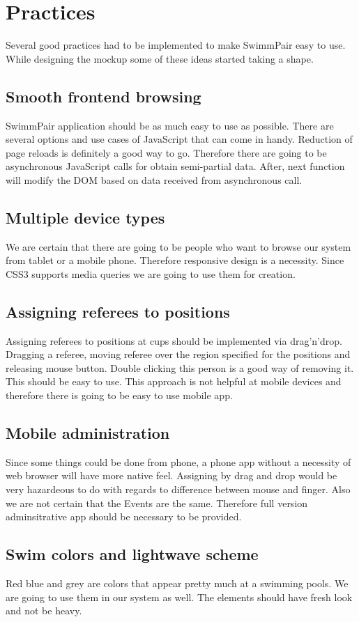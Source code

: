 \section{Practices}
Several good practices had to be implemented to make SwimmPair easy to use. While designing the mockup some of these ideas started taking a shape.
\subsection*{Smooth frontend browsing}
\par
SwimmPair application should be as much easy to use as possible. There are several options and use cases of JavaScript that can come in handy. Reduction of page reloads is definitely a good way to go. Therefore there are going to be asynchronous JavaScript calls for obtain semi-partial data. After, next function will modify the DOM based on data received from asynchronous call. 
\subsection*{Multiple device types}
\par
We are certain that there are going to be people who want to browse our system from tablet or a mobile phone. Therefore responsive design is a necessity. Since CSS3 \cite{lamport94} supports media queries we are going to use them for creation.
\subsection*{Assigning referees to positions}
\par
Assigning referees to positions at cups should be implemented via drag'n'drop. Dragging a referee, moving referee over the region specified for the positions and releasing mouse button. Double clicking this person is a good way of removing it. This should be easy to use. This approach is not helpful at mobile devices and therefore there is going to be easy to use mobile app.
\subsection*{Mobile administration}
Since some things could be done from phone, a phone app without a necessity of web browser will have more native feel. Assigning by drag and drop would be very hazardeous to do with regards to difference between mouse and finger. Also we are not certain that the Events are the same. Therefore full version adminsitrative app should be necessary to be provided.
\subsection*{Swim colors and lightwave scheme}
\par
Red blue and grey are colors that appear pretty much at a swimming pools. We are going to use them in our system as well. The elements should have fresh look and not be heavy.
